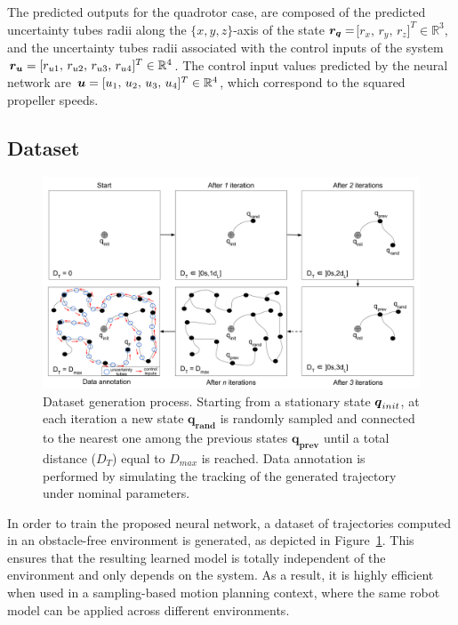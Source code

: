 The predicted outputs for the quadrotor case, are composed of the predicted uncertainty tubes radii along the $\{x,y,z\}$-axis of the state $\boldsymbol{r_q}=$[$r_{x},\,r_{y},\,r_{z}]^T \in \mathbb{R}^3$, and the uncertainty tubes radii associated with the control inputs of the system $\boldsymbol{r_u} = [r_{u1},\,r_{u2},\,r_{u3},\,r_{u4}]^T \in \mathbb{R}^4$.
The control input values predicted by the neural network are $\boldsymbol{u} = [u_1 ,\, u_2 ,\, u_3 ,\, u_4]^T \in \mathbb{R}^4$, which correspond to the squared propeller speeds.

\subsection{Dataset}\label{sec:dataset_general}

\begin{figure} [htp]
    \centering
    \includegraphics[width=0.9\linewidth]{figures/learning_quadrotor/dataset_generation.png}%
    \caption{Dataset generation process. 
    Starting from a stationary state $\boldsymbol{q}_{init}$, at each iteration a new state $\boldsymbol{q_{rand}}$ is randomly sampled and connected to the nearest one among the previous states $\boldsymbol{q_{prev}}$ until a total distance ($D_T$) equal to $D_{max}$ is reached.
    Data annotation is performed by simulating the tracking of the generated trajectory under nominal parameters.
    }%
    \label{fig: data_generation}%
\end{figure}

In order to train the proposed neural network, a dataset of trajectories computed in an obstacle-free environment is generated, as depicted in Figure~\ref{fig: data_generation}.
This ensures that the resulting learned model is totally independent of the environment and only depends on the system.
As a result, it is highly efficient when used in a sampling-based motion planning context, where the same robot model can be applied across different environments.

